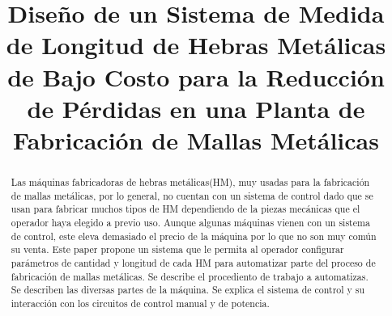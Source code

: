 \documentclass[conference]{IEEEtran}
\begin{document}
%
\title{
  Diseño de un Sistema de Medida de Longitud de Hebras
  Metálicas de Bajo Costo para la Reducción de Pérdidas
  en una Planta de Fabricación de Mallas Metálicas
}


\author{
  \and
}



\maketitle

\begin{abstract}
Las máquinas fabricadoras de hebras metálicas(HM), muy
usadas para la fabricación de mallas metálicas, por lo
general, no cuentan con un sistema de control dado que se
usan para fabricar muchos tipos de HM dependiendo de la
piezas mecánicas que el operador haya elegido a previo uso.
Aunque algunas máquinas vienen con un sistema de control,
este eleva demasiado el precio de la máquina por lo que no
son muy común su venta. Este paper propone un sistema que
le permita al operador configurar parámetros de cantidad y
longitud de cada HM para automatizar parte del proceso
de fabricación de mallas metálicas. Se describe el procediento
de trabajo a automatizas. Se describen las diversas partes
de la máquina. Se explica el sistema de control y su interacción
con los circuitos de control manual y de potencia.
\end{abstract}


%
\IEEEpeerreviewmaketitle
\end{document}
